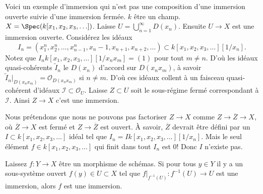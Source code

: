 \begin{example}

\label{example-thibaut}

Voici un exemple d'immersion qui n'est pas une composition d'une immersion ouverte suivie d'une immersion fermée. $k$ être un champ. $X = \Spec(k[x_1, x_2, x_3, \ldots])$. Laisse $U = \bigcup_{n = 1}^{\infty} D(x_n)$. Ensuite $U \to X$ est une immersion ouverte. Considérez les idéaux
$$
I_n =
(x_1^n, x_2^n, \ldots, x_{n - 1}^n, x_n - 1, x_{n + 1}, x_{n + 2}, \ldots)
\subset
k[x_1, x_2, x_3, \ldots][1/x_n].
$$
Notez que $I_n k[x_1, x_2, x_3, \ldots][1/x_nx_m] = (1)$
pour tout $m \not = n$. D'où les idéaux quasi-cohérents
$\widetilde I_n$ le $D(x_n)$ d'accord sur $D(x_nx_m)$, à savoir
$\widetilde I_n|_{D(x_nx_m)} = \mathcal{O}_{D(x_n x_m)}$ si
$n \not = m$. D'où ces idéaux collent à un faisceau quasi-cohérent d'idéaux
$\mathcal{I} \subset \mathcal{O}_U$. Laisse $Z \subset U$ soit le sous-régime fermé correspondant à
$\mathcal{I}$. Ainsi $Z \to X$ c'est une immersion.

\medskip\noindent
Nous prétendons que nous ne pouvons pas factoriser $Z \to X$ comme $Z \to \overline{Z} \to X$, où $\overline{Z} \to X$ est fermé et $Z \to \overline{Z}$ est ouvert. À savoir, $\overline{Z}$ devrait être défini par un $I \subset k[x_1, x_2, x_3, \ldots]$ idéal tel que $I_n = I k[x_1, x_2, x_3, \ldots][1/x_n]$. Mais le seul élément $f \in k[x_1, x_2, x_3, \ldots]$ qui finit dans tout $I_n$ est $0$! Donc $I$ n'existe pas.
\end{example}

\begin{lemma}

\label{lemma-check-immersion}
Laissez $f : Y \to X$ être un morphisme de schémas. Si pour tous $y \in Y$ il y a un sous-système ouvert $f(y) \in U \subset X$ tel que $f|_{f^{-1}(U)} : f^{-1}(U) \to U$ est une immersion, alors $f$ est une immersion.
\end{lemma}

